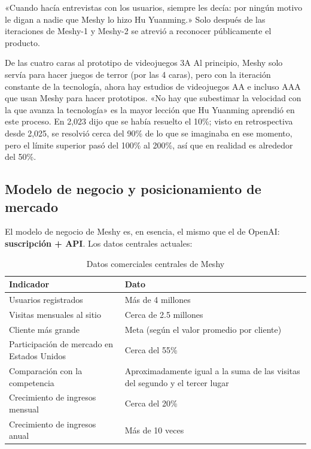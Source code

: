 \documentclass[a4paper]{article}
\begin{document}
«Cuando hacía entrevistas con los usuarios, siempre les decía: por ningún motivo le digan a nadie que Meshy lo hizo Hu Yuanming.» Solo después de las iteraciones de Meshy-1 y Meshy-2 se atrevió a reconocer públicamente el producto.

\begin{knowledgebox}{De las cuatro caras al prototipo de videojuegos 3A}
Al principio, Meshy solo servía para hacer juegos de terror (por las 4 caras), pero con la iteración constante de la tecnología, ahora hay estudios de videojuegos AA e incluso AAA que usan Meshy para hacer prototipos. «No hay que subestimar la velocidad con la que avanza la tecnología» es la mayor lección que Hu Yuanming aprendió en este proceso. En 2,023 dijo que se había resuelto el 10\%; visto en retrospectiva desde 2,025, se resolvió cerca del 90\% de lo que se imaginaba en ese momento, pero el límite superior pasó del 100\% al 200\%, así que en realidad es alrededor del 50\%.
\end{knowledgebox}

\subsection{Modelo de negocio y posicionamiento de mercado}

El modelo de negocio de Meshy es, en esencia, el mismo que el de OpenAI: \textbf{suscripción + API}. Los datos centrales actuales:

\begin{table}[H]
\centering
\caption{Datos comerciales centrales de Meshy}
\begin{tabular}{ll}
\toprule
\textbf{Indicador} & \textbf{Dato} \\
\midrule
Usuarios registrados & Más de 4 millones \\
Visitas mensuales al sitio & Cerca de 2.5 millones \\
Cliente más grande & Meta (según el valor promedio por cliente) \\
Participación de mercado en Estados Unidos & Cerca del 55\% \\
Comparación con la competencia & Aproximadamente igual a la suma de las visitas del segundo y el tercer lugar \\
Crecimiento de ingresos mensual & Cerca del 20\% \\
Crecimiento de ingresos anual & Más de 10 veces \\
\bottomrule
\end{tabular}
\end{table}
\end{document}
